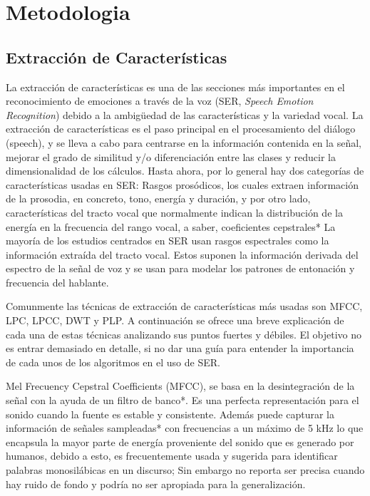 \documentclass[11pt,a4paper,spanish]{book}
\begin{document}
		\chapter{Metodologia}
		\section{Extracción de Características}
		La extracción de características es una de las secciones más importantes en el reconocimiento de emociones a través de la voz (SER, \emph{Speech Emotion Recognition}) debido a la ambigüedad de las características y la variedad vocal. La extracción de características es el paso principal en el procesamiento del diálogo (speech), y se lleva a cabo para centrarse en la información contenida en la señal, mejorar el grado de similitud y/o diferenciación entre las clases y reducir la dimensionalidad de los cálculos.\cite{Hellbernd2016} Hasta ahora, por lo general hay dos categorías de características usadas en SER:
		Rasgos prosódicos, los cuales extraen información de la prosodia, en concreto, tono, energía y duración, y por otro lado, características del tracto vocal que normalmente indican la distribución de la energía en la frecuencia del rango vocal, a saber, coeficientes cepstrales*
		La mayoría de los estudios centrados en SER usan rasgos espectrales como la información extraída del tracto vocal. Estos suponen la información derivada del espectro de la señal de voz y se usan para modelar los patrones de entonación y frecuencia del hablante.\cite{Langari2020}
		
		
		
		Comunmente las técnicas de extracción de características más usadas son 
		MFCC, LPC, LPCC, DWT y PLP. A continuación se ofrece una breve explicación de cada una de estas técnicas analizando sus puntos fuertes y débiles.\cite{Rashid2018} El objetivo no es entrar demasiado en detalle, si no dar una guía para entender la importancia de cada unos de los algoritmos en el uso de SER.
		
		Mel Frecuency Cepstral Coefficients (MFCC), se basa en la desintegración de la señal con la ayuda de un filtro de banco*. Es una perfecta representación para el sonido cuando la fuente es estable y consistente. Además puede capturar la información de señales sampleadas* con frecuencias a un máximo de 5 kHz lo que encapsula la mayor parte de energía proveniente del sonido que es generado por humanos, debido a esto, es frecuentemente usada y sugerida para identificar palabras monosilábicas en un discurso; Sin embargo no reporta ser precisa cuando hay ruido de fondo y podría no ser apropiada para la generalización.
		
\end{document}
